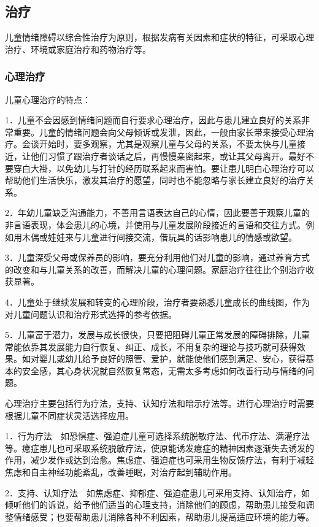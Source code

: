 \subsection{治疗}

儿童情绪障碍以综合性治疗为原则，根据发病有关因素和症状的特征，可采取心理治疗、环境或家庭治疗和药物治疗等。

\subsubsection{心理治疗}

儿童心理治疗的特点：

1．儿童不会因感到情绪问题而自行要求心理治疗，因此与患儿建立良好的关系非常重要。儿童的情绪问题会向父母倾诉或发泄，因此，一般由家长带来接受心理治疗。会谈开始时，要多观察，尤其是观察儿童与父母的关系，不要太快与儿童接近，让他们习惯了跟治疗者谈话之后，再慢慢亲密起来，或让其父母离开。最好不要穿白大褂，以免幼儿与打针的经历联系起来而害怕。要让患儿明白心理治疗可以帮助他们生活快乐，激发其治疗的愿望，同时也不能忽略与家长建立良好的治疗关系。

2．年幼儿童缺乏沟通能力，不善用言语表达自己的心情，因此要善于观察儿童的非言语表现，体会患儿的心境，并使用与儿童发展阶段接近的言语和交往方式。例如用木偶或娃娃来与儿童进行间接交流，借玩具的话影响患儿的情感或欲望。

3．儿童深受父母或保养员的影响，要充分利用他们对儿童的影响，通过养育方式的改变和与儿童关系的改善，而解决儿童的心理问题。家庭治疗往往比个别治疗收获显著。

4．儿童处于继续发展和转变的心理阶段，治疗者要熟悉儿童成长的曲线图，作为对儿童问题认识和治疗形式选择的参考依据。

5．儿童富于潜力，发展与成长很快，只要把阻碍儿童正常发展的障碍排除，儿童常能依靠其发展能力自行恢复、纠正、成长，不用复杂的理论与技巧就可获得效果。如对婴儿或幼儿给予良好的照管、爱护，就能使他们感到满足、安心，获得基本的安全感，其心身状况就自然恢复常态，无需太多考虑如何改善行动与情绪的问题。

心理治疗主要包括行为疗法，支持、认知疗法和暗示疗法等。进行心理治疗时需要根据儿童不同症状灵活选择应用。

1．行为疗法　如恐惧症、强迫症儿童可选择系统脱敏疗法、代币疗法、满灌疗法等。癔症患儿也可采取系统脱敏疗法，使原能诱发癔症的精神因素逐渐失去诱发的作用，减少发作或达到治愈。焦虑症、强迫症也可采用生物反馈疗法，有利于减轻焦虑和自主神经功能紊乱，改善睡眠，对治疗起到辅助作用。

2．支持、认知疗法　如焦虑症、抑郁症、强迫症患儿可采用支持、认知治疗，如倾听他们的诉说，给予他们适当的心理支持，消除他们的顾虑，帮助患儿接受和调整情绪感受；也要帮助患儿消除各种不利因素，帮助患儿提高适应环境的能力等。

